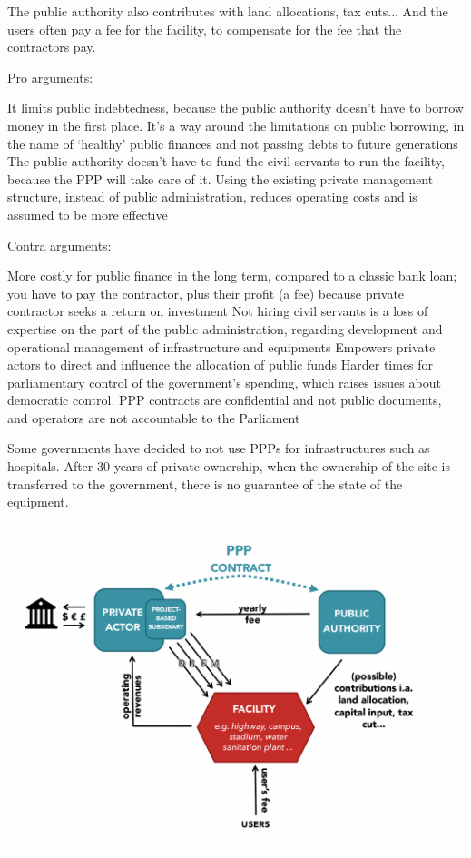 \documentclass{article}
\begin{document}
The public authority also contributes with land allocations, tax cuts... And the users often pay a fee for the facility, to compensate for the fee that the contractors pay.

Pro arguments:
\begin{outline} 
	\1 It limits public indebtedness, because the public authority doesn't have to borrow money in the first place. It's a way around the limitations on public borrowing, in the name of `healthy' public finances and not passing debts to future generations
	\1 The public authority doesn't have to fund the civil servants to run the facility, because the PPP will take care of it. Using the existing private management structure, instead of public administration, reduces operating costs and is assumed to be more effective
\end{outline}

Contra arguments:
\begin{outline}
	\1 More costly for public finance in the long term, compared to a classic bank loan; you have to pay the contractor, plus their profit (a fee) because private contractor seeks a return on investment
	\1 Not hiring civil servants is a loss of expertise on the part of the public administration, regarding development and operational management of infrastructure and equipments
	\1 Empowers private actors to direct and influence the allocation of public funds
	\1 Harder times for parliamentary control of the government's spending, which raises issues about democratic control. PPP contracts are confidential and not public documents, and operators are not accountable to the Parliament
\end{outline}

Some governments have decided to not use PPPs for infrastructures such as hospitals. After 30 years of private ownership, when the ownership of the site is transferred to the government, there is no guarantee of the state of the equipment.

\begin{center}
\includegraphics[width=35em]{public_private_partnerships}
\end{center}
\end{document}
